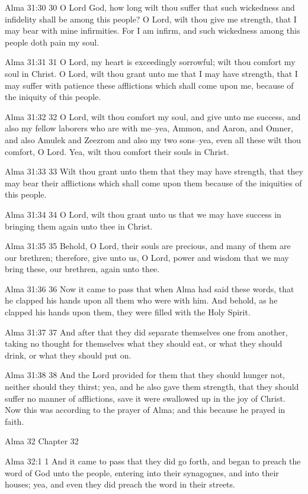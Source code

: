 Alma 31:30
 30 O Lord God, how long wilt thou suffer that such wickedness
and infidelity shall be among this people? O Lord, wilt thou
give me strength, that I may bear with mine infirmities. For I
am infirm, and such wickedness among this people doth pain my
soul.

Alma 31:31
 31 O Lord, my heart is exceedingly sorrowful; wilt thou comfort
my soul in Christ. O Lord, wilt thou grant unto me that I may
have strength, that I may suffer with patience these afflictions
which shall come upon me, because of the iniquity of this people.

Alma 31:32
 32 O Lord, wilt thou comfort my soul, and give unto me success,
and also my fellow laborers who are with me--yea, Ammon, and
Aaron, and Omner, and also Amulek and Zeezrom and also my two
sons--yea, even all these wilt thou comfort, O Lord. Yea, wilt
thou comfort their souls in Christ.

Alma 31:33
 33 Wilt thou grant unto them that they may have strength, that
they may bear their afflictions which shall come upon them
because of the iniquities of this people.

Alma 31:34
 34 O Lord, wilt thou grant unto us that we may have success in
bringing them again unto thee in Christ.

Alma 31:35
 35 Behold, O Lord, their souls are precious, and many of them
are our brethren; therefore, give unto us, O Lord, power and
wisdom that we may bring these, our brethren, again unto thee.

Alma 31:36
 36 Now it came to pass that when Alma had said these words, that
he clapped his hands upon all them who were with him. And
behold, as he clapped his hands upon them, they were filled with
the Holy Spirit.

Alma 31:37
 37 And after that they did separate themselves one from another,
taking no thought for themselves what they should eat, or what
they should drink, or what they should put on.

Alma 31:38
 38 And the Lord provided for them that they should hunger not,
neither should they thirst; yea, and he also gave them strength,
that they should suffer no manner of afflictions, save it were
swallowed up in the joy of Christ. Now this was according to the
prayer of Alma; and this because he prayed in faith.

Alma 32
Chapter 32

Alma 32:1
 1 And it came to pass that they did go forth, and began to
preach the word of God unto the people, entering into their
synagogues, and into their houses; yea, and even they did preach
the word in their streets.

